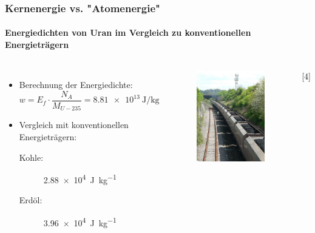 \documentclass{beamer}[9pt]
\begin{document}
\begin{frame}
\frametitle{Kernenergie vs. "Atomenergie"}
\framesubtitle{Energiedichten von Uran im Vergleich zu konventionellen Energieträgern}
\begin{columns}
\begin{itemize}
\item Berechnung der Energiedichte:
\[
w = E_f \cdot \frac{ N_A }{M_{U-235}} = \SI{8.81e13}{\joule\per\kilogram}
\]
\item Vergleich mit konventionellen Energieträgern:\\

\begin{description}

\item[ Kohle:] \SI{2.88e4}{\joule\per\kg}
\item[Erdöl:] \SI{3.96e4}{\joule\per\kg}

\end{description}
\end{itemize}
\begin{figure}[htp]
\includegraphics[scale=.15]{coal.jpg}
\end{figure}
\hspace{.5\columnwidth}[4]
\end{columns}
\end{frame}
\end{document}
